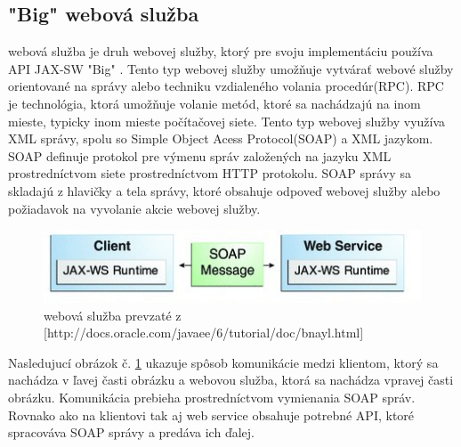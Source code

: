 \subsection{"Big" webová služba}
 webová služba je druh webovej služby, ktorý pre svoju implementáciu používa API JAX-SW\cite{fitWeb} "Big" . Tento typ webovej služby umožňuje vytvárať webové služby orientované na správy alebo techniku vzdialeného volania procedúr(RPC). RPC je technológia, ktorá umožňuje volanie metód, ktoré sa nachádzajú na inom mieste, typicky inom mieste počítačovej siete. Tento typ webovej služby využíva XML správy, spolu so Simple Object Acess Protocol(SOAP) a XML jazykom. SOAP definuje protokol pre výmenu správ založených na jazyku XML prostredníctvom siete prostredníctvom HTTP protokolu. SOAP správy sa skladajú z hlavičky a tela správy, ktoré obsahuje odpoveď webovej služby alebo požiadavok na vyvolanie akcie webovej služby.
\begin{figure}[htb]

\begin{center}

\includegraphics[scale=0.5]{webservice.jpg} 
\caption{ webová služba  prevzaté z [http://docs.oracle.com/javaee/6/tutorial/doc/bnayl.html] }
\label{com}

\end{center}

\end{figure}
Nasledujucí obrázok č. \ref{com} ukazuje spôsob komunikácie medzi klientom, ktorý sa nachádza v ľavej časti obrázku a webovou služba, ktorá sa nachádza vpravej časti obrázku. Komunikácia prebieha prostredníctvom vymienania SOAP správ. Rovnako ako na klientovi tak aj web service obsahuje potrebné API, ktoré spracováva SOAP správy a predáva ich ďalej.

